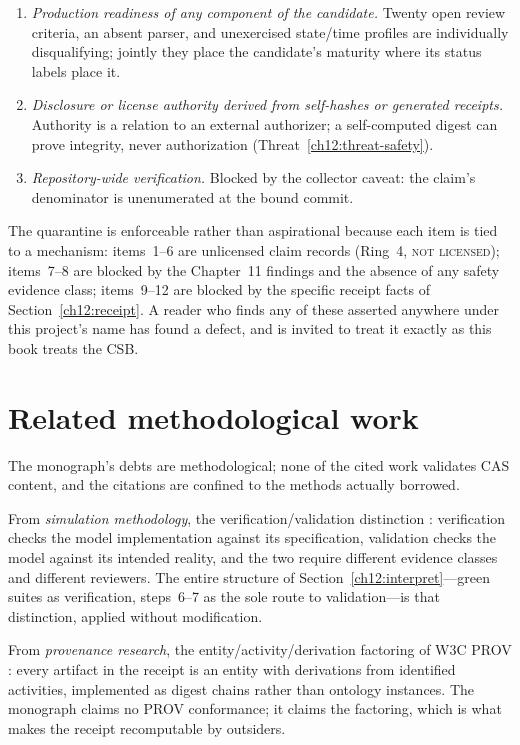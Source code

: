 \begin{enumerate}
\item \emph{Production readiness of any component of the candidate.} Twenty open review criteria, an absent parser, and unexercised state/time profiles are individually disqualifying; jointly they place the candidate's maturity where its status labels place it.
\item \emph{Disclosure or license authority derived from self-hashes or generated receipts.} Authority is a relation to an external authorizer; a self-computed digest can prove integrity, never authorization (Threat~\ref{ch12:threat-safety}).
\item \emph{Repository-wide verification.} Blocked by the collector caveat: the claim's denominator is unenumerated at the bound commit.
\end{enumerate}

The quarantine is enforceable rather than aspirational because each item is tied to a mechanism: items~1--6 are unlicensed claim records (Ring~4, \textsc{not licensed}); items~7--8 are blocked by the Chapter~11 findings and the absence of any safety evidence class; items~9--12 are blocked by the specific receipt facts of Section~\ref{ch12:receipt}. A reader who finds any of these asserted anywhere under this project's name has found a defect, and is invited to treat it exactly as this book treats the CSB.

\section{Related methodological work}\label{ch12:related}

The monograph's debts are methodological; none of the cited work validates CAS content, and the citations are confined to the methods actually borrowed.

From \emph{simulation methodology}, the verification/validation distinction \cite{sargent}: verification checks the model implementation against its specification, validation checks the model against its intended reality, and the two require different evidence classes and different reviewers. The entire structure of Section~\ref{ch12:interpret}---green suites as verification, steps~6--7 as the sole route to validation---is that distinction, applied without modification.

From \emph{provenance research}, the entity/activity/derivation factoring of W3C PROV \cite{prov}: every artifact in the receipt is an entity with derivations from identified activities, implemented as digest chains rather than ontology instances. The monograph claims no PROV conformance; it claims the factoring, which is what makes the receipt recomputable by outsiders.

